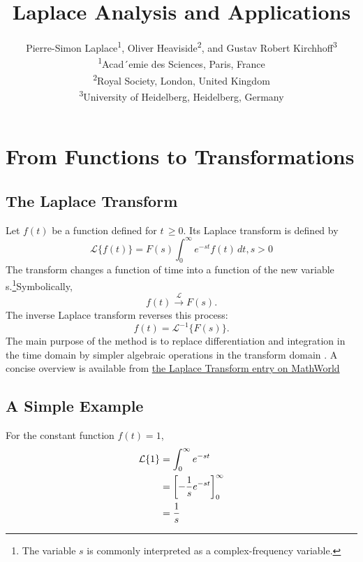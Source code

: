 \documentclass[a4paper,11pt]{article}
\title{\textbf{Laplace Analysis and Applications}}
\author{%
  Pierre-Simon Laplace\textsuperscript{1}, Oliver Heaviside\textsuperscript{2}, and Gustav Robert Kirchhoff\textsuperscript{3} \\
  \small
  \textsuperscript{1}Acad´emie des Sciences, Paris, France\\
\textsuperscript{2}Royal Society, London, United Kingdom\\
\textsuperscript{3}University of Heidelberg, Heidelberg, Germany
}
\date{}
\begin{document}
\maketitle
\section{From Functions to Transformations}
\subsection{The Laplace Transform}
Let $f(t)$ be a function defined for $t\,\geq 0$. Its Laplace transform is defined by
\begin{equation}
    \mathcal{L}\{f(t)\}=F(s) \int_0^\infty e^{-st}f(t)\, dt, s\gt 0
\end{equation}
The transform changes a function of time into a function of the new variable s.\footnote{The variable $s$ is commonly interpreted as a complex-frequency variable.}Symbolically,
\begin{equation*}
    f(t) \xrightarrow{\mathcal{L}} F(s).
\end{equation*}
The inverse Laplace transform reverses this process:
\begin{equation}
    f(t)=\mathcal{L}^{-1} \{ F(s)\}.
\end{equation}
The main purpose of the method is to replace differentiation and integration in the time domain
by simpler algebraic operations in the transform domain \cite{kreyszig2011}. A concise overview is available from
\href{https://mathworld.wolfram.com/LaplaceTransform.html}{the Laplace Transform entry on MathWorld}
\subsection{A Simple Example}
For the constant function $f(t)=1$,
\begin{align}
    \mathcal{L}\{ 1\} &=\int_0^\infty e^{-st}\ \notag
\\    &=\left[ -\frac{1}{s}e^{-st}\right]_0^\infty \notag \\
&=\frac{1}{s}
\end{align}
\newpage
\end{document}
